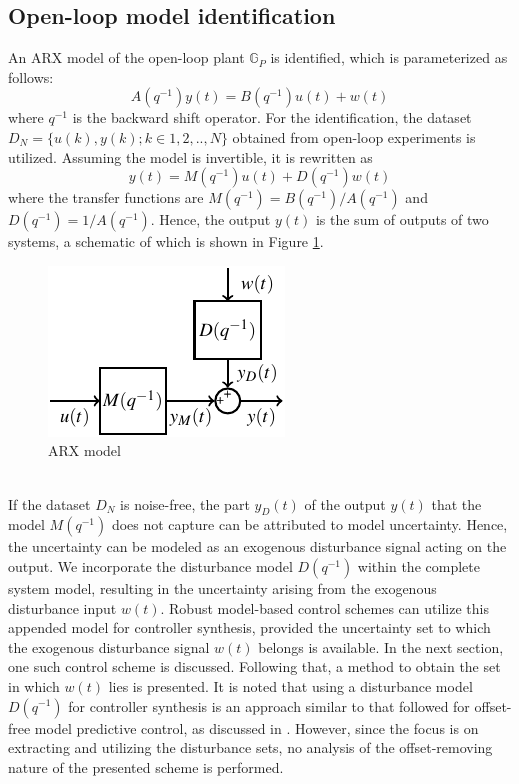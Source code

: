 \documentclass[letterpaper, 10 pt, conference]{ieeeconf}  %
\begin{document}
\subsection{Open-loop model identification}
An ARX model of the open-loop plant $\mathbb{G}_P$ is identified, which is parameterized as follows:
\begin{equation*} 
A(q^{-1})y(t)=B(q^{-1})u(t)+w(t)
\end{equation*}
where $q^{-1}$ is the backward shift operator.
For the identification, the dataset $D_N=\{u(k),y(k);k\in1,2,..,N\}$ obtained from open-loop experiments is utilized. Assuming the model is invertible, it is rewritten as
\begin{equation} 
y(t)=M(q^{-1})u(t)+D(q^{-1})w(t)
\label{tfmodel}
\end{equation}
where the transfer functions are $M(q^{-1})=B(q^{-1})/A(q^{-1})$ and $D(q^{-1})=1/A(q^{-1})$. Hence, the output $y(t)$ is the sum of outputs of two systems, a schematic of which is shown in Figure \ref{fig:fullloop}.
	\begin{figure}[h]
		\vspace{-3pt}
		\hspace{45pt}
		\includegraphics[scale = 01.1]{final_robust.pdf}
		\caption{ARX model}
		\label{fig:fullloop}
	\end{figure} \\
If the dataset $D_N$ is noise-free, the part $y_D(t)$ of the output $y(t)$ that the model $M(q^{-1})$ does not capture can be attributed to model uncertainty. Hence, the uncertainty can be modeled as an exogenous disturbance signal acting on the output. We incorporate the disturbance model $D(q^{-1})$ within the complete system model, resulting in the uncertainty arising from the exogenous disturbance input $w(t)$. Robust model-based control schemes can utilize this appended model for controller synthesis, provided the uncertainty set to which the exogenous disturbance signal $w(t)$ belongs is available. In the next section, one such control scheme is discussed. Following that, a method to obtain the set in which $w(t)$ lies is presented. It is noted that using a disturbance model $D(q^{-1})$ for controller synthesis is an approach similar to that followed for offset-free model predictive control, as discussed in \cite{doi:10.1002/aic.690490213}. However, since the focus is on extracting and utilizing the disturbance sets, no analysis of the offset-removing nature of the presented scheme is performed.
\end{document}
